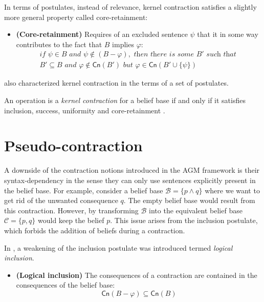 In terms of postulates, instead of relevance, kernel contraction satisfies a slightly more general property called core-retainment:
\begin{itemize}
    \item[] \textbf{(Core-retainment)} Requires of an excluded sentence $\psi$ that it in some way contributes to the fact that $B$ implies $\varphi$:
    \begin{equation*}
        \begin{split}
            \textit{if } \psi \in B \textit{ and } \psi \notin (B - \varphi), \textit{ then there is some } B' \textit{ such that } \\
            B' \subseteq B \textit{ and } \varphi \notin \textsf{Cn}(B') \textit{ but } \varphi \in \textsf{Cn}(B' \cup \{ \psi \}) 
        \end{split}
    \end{equation*}
\end{itemize}

\citeauthor{Hansson1994} also characterized kernel contraction in the terms of a set of postulates.

\begin{theorem}
    An operation is a \textit{kernel contraction} for a belief base if and only if it satisfies inclusion, success, uniformity and core-retainment \citep{Hansson1994}.
\end{theorem}

\section{Pseudo-contraction}

A downside of the contraction notions introduced in the AGM framework \citep{AGM1985} is their syntax-dependency in the sense they can only use sentences explicitly present in the belief base. For example, consider a belief base $\mathcal{B} = \{ p \wedge q \}$ where we want to get rid of the unwanted consequence $q$. The empty belief base would result from this contraction. However, by transforming $\mathcal{B}$ into the equivalent belief base $\mathcal{C} = \{ p, q \}$ would keep the belief $p$. This issue arises from the inclusion postulate, which forbids the addition of beliefs during a contraction. 

In \citet{Hansson1989}, a weakening of the inclusion postulate was introduced termed \textit{logical inclusion}.

\begin{itemize}
    \item[] \textbf{(Logical inclusion)} The consequences of a contraction are contained in the consequences of the belief base:
    $$\textsf{Cn}(B - \varphi) \subseteq \textsf{Cn}(B)$$
\end{itemize}

